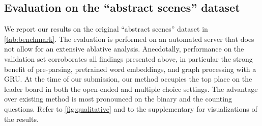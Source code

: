 
\subsection{Evaluation on the ``abstract scenes'' dataset}
We report our results on the original ``abstract scenes'' dataset in \tab\ref{tab:benchmark}. The evaluation is performed on an automated server that does not allow for an extensive ablative analysis. Anecdotally, performance on the validation set corroborates all findings presented above, in particular the strong benefit of pre-parsing, pretrained word embeddings, and graph processing with a GRU. At the time of our submission, our method occupies the top place on the leader board in both the open-ended and multiple choice settings. The advantage over existing method is most pronounced on the binary and the counting questions. Refer to \fig\ref{fig:qualitative} and to the supplementary for visualizations of the results.



